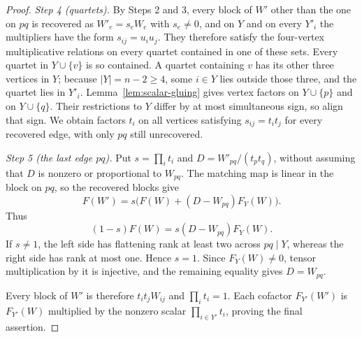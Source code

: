 \documentclass[11pt]{article}
\theoremstyle{remark}\newtheorem{remark}[theorem]{Remark}
\begin{document}
\begin{proof}
\emph{Step 4 (quartets).} By Steps 2 and 3, every block of $W'$ other
than the one on $pq$ is recovered as $W'_e=s_eW_e$ with $s_e\ne0$, and
on $Y$ and on every $Y'_i$ the multipliers have the form
$s_{ij}=u_iu_j$. They therefore satisfy the four-vertex multiplicative
relations on every quartet contained in one of these sets. Every
quartet in $Y\cup\{v\}$ is so contained. A quartet containing $v$ has
its other three vertices in $Y$; because $|Y|=n-2\geq4$, some $i\in Y$
lies outside those three, and the quartet lies in $Y'_i$.
Lemma~\ref{lem:scalar-gluing} gives vertex factors on $Y\cup\{p\}$
and on $Y\cup\{q\}$. Their restrictions to $Y$ differ by at most
simultaneous sign, so align that sign. We obtain factors $t_i$ on all
vertices satisfying $s_{ij}=t_it_j$ for every recovered edge, with
only $pq$ still unrecovered.

\emph{Step 5 (the last edge $pq$).} Put $s=\prod_i t_i$ and
$D=W'_{pq}/(t_pt_q)$, without assuming that $D$ is nonzero or
proportional to $W_{pq}$. The matching map is linear in the block on
$pq$, so the recovered blocks give
\[
 F(W')=s\bigl(F(W)+(D-W_{pq})F_Y(W)\bigr).
\]
Thus
\[
 (1-s)F(W)=s(D-W_{pq})F_Y(W).
\]
If $s\ne1$, the left side has flattening rank at least two across
$pq\mid Y$, whereas the right side has rank at most one. Hence
$s=1$. Since $F_Y(W)\ne0$, tensor multiplication by it is injective,
and the remaining equality gives $D=W_{pq}$.

Every block of $W'$ is therefore $t_it_jW_{ij}$ and
$\prod_i t_i=1$. Each cofactor $F_{Y'}(W')$ is $F_{Y'}(W)$ multiplied
by the nonzero scalar $\prod_{i\in Y'}t_i$, proving the final
assertion.
\end{proof}
\end{document}
